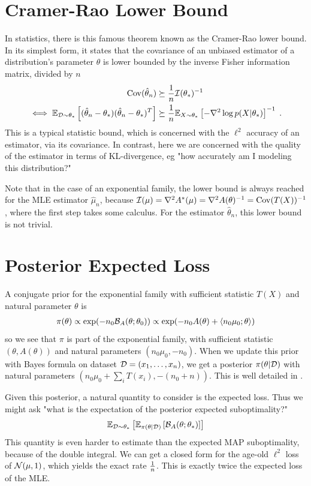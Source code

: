 \documentclass{article}
\newcommand*{\expect}[2][]{\ensuremath{\mathbb{E}_{#1} \left[ #2 \right] }} %
\newcommand{\logpart}{A}
\newcommand{\conj}{\logpart^*}
\newcommand{\bregman}{\cB_\logpart}
\newcommand{\natp}{\theta}
\begin{document}
\section{Cramer-Rao Lower Bound}
In statistics, there is this famous theorem known as the Cramer-Rao lower bound. In its simplest form, it states that the covariance of an unbiased estimator of a distribution's parameter $\natp$ is lower bounded by the inverse Fisher information matrix, divided by $n$
\begin{align}
    \Cov(\hat \natp_n)  
    &\succeq \inv{n} \cI(\natp_*)^{-1} \\
    \iff
    \expect[\cD\sim \natp_*]{(\hat \natp_n - \natp_*)(\hat \natp_n - \natp_*)^T}
    &\succeq \inv{n} \expect[X\sim \natp_*]{-\nabla^2 \log p(X|\natp_*)}^{-1} \; .
\end{align}
This is a typical statistic bound, which is concerned with the $\ell^2$ accuracy of an estimator, via its covariance. In contrast, here we are concerned with the quality of the estimator in terms of KL-divergence, eg "how accurately am I modeling this distribution?"

Note that in the case of an exponential family, the lower bound is always reached for the MLE estimator $\hat \mu_n$, because $\cI(\mu) = \nabla^2 \conj(\mu) = \nabla^2 \logpart(\natp)^{-1} = \Cov(T(X))^{-1}$, where the first step takes some calculus. For the estimator $\hat \natp_n$, this lower bound is not trivial.

\section{Posterior Expected Loss}

A conjugate prior for the exponential family with sufficient statistic $T(X)$ and natural parameter $\natp$ is 
\begin{align}
    \pi(\natp) 
    \propto \exp(-n_0 \bregman(\natp ; \natp_0)) 
    \propto \exp(-n_0 \logpart(\natp) + \langle n_0 \mu_0 ; \natp \rangle)
\end{align}
so we see that $\pi$ is part of the exponential family, with sufficient statistic $(\natp, \logpart(\natp))$ and natural parameters $(n_0 \mu_0 , -n_0)$. When we update this prior with Bayes formula on dataset ${\mathcal D}=(x_1,\dots,x_n)$, we get a posterior $\pi(\natp | \cD)$ with natural parameters $(n_0 \mu_0 + \sum_i T(x_i) , -(n_0 + n))$. This is well detailed in \citet{agarwal2010geometric}. 

Given this posterior, a natural quantity to consider is the expected loss. Thus we might ask "what is the expectation of the posterior expected suboptimality?"
\begin{align}
    \expect[\cD\sim\natp_*]{\expect[\pi(\natp|\cD)]{\bregman(\natp ; \natp_*)}}
\end{align}
This quantity is even harder to estimate than the expected MAP suboptimality, because of the double integral. We can get a closed form for the age-old $\ell^2$ loss of ${\mathcal N}(\mu, 1)$, which yields the exact rate $\frac{1}{n}$. This is exactly twice the expected loss of the MLE.
\end{document}
